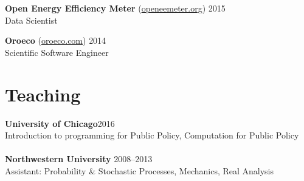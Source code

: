\documentclass[margin,line]{resume}
\begin{document}
\begin{resume}
	{\bf Open Energy Efficiency Meter} (\href{http://www.openeemeter.org/}{openeemeter.org}) \hfill {2015} \\
	Data Scientist

	{\bf Oroeco} (\href{http://www.oroeco.com}{oroeco.com}) \hfill {2014} \\
	Scientific Software Engineer %
        \section{\mysidestyle Teaching}
        {\bf University of Chicago}\hfill{2016}\\
        Introduction to programming for Public Policy, Computation for Public Policy\\\\
	{\bf Northwestern University} \hfill {2008--2013}\\
	Assistant: Probability \& Stochastic Processes, Mechanics, Real Analysis%
	

\end{resume}
\end{document}
